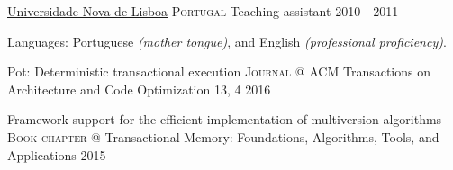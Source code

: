 \documentclass[10pt,a4paper]{article}
\begin{document}
\headedsection  %
  {\href{http://fct.unl.pt}{Universidade Nova de Lisboa}}
  {\textsc{Portugal}} {%
  \headedsubsection
    {Teaching assistant}
    {2010---2011}
    {}
}



\spacedhrule{0.5em}{-0.4em}




\inlineheadsection
  {Languages:}
  {Portuguese \emph{(mother tongue)}, and English \emph{(professional proficiency)}.}


\spacedhrule{1.6em}{-0.4em}



\headedsection
  {Pot: Deterministic transactional execution}
  {\textsc{Journal}} {%
  \headedsubsection
    {@ ACM Transactions on Architecture and Code Optimization 13, 4}
    {2016}
    {}
}

\headedsection
  {Framework support for the efficient implementation of multiversion algorithms}
  {\textsc{Book chapter}} {%
  \headedsubsection
    {@ Transactional Memory: Foundations, Algorithms, Tools, and Applications}
    {2015}
    {}
}
\end{document}
